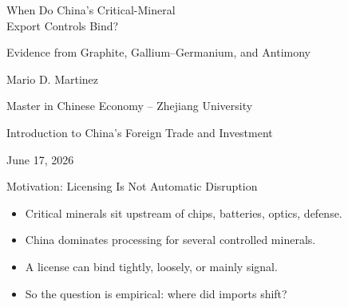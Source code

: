 \documentclass[aspectratio=169,11pt]{beamer}
\begin{document}
\begin{frame}[plain]
  \vspace{0.65cm}
  {
  When Do China's Critical-Mineral\\Export Controls Bind?\par}
  \vspace{0.4cm}
  {Evidence from Graphite, Gallium--Germanium, and Antimony\par}
  \vfill
  {\large Mario D. Martinez\par}
  \vspace{0.15cm}
  {Master in Chinese Economy -- Zhejiang University\par}
  {Introduction to China's Foreign Trade and Investment\par}
  \vspace{0.3cm}
  {June 17, 2026\par}
\end{frame}

\begin{frame}{Motivation: Licensing Is Not Automatic Disruption}
  \large
  \begin{itemize}
    \item Critical minerals sit upstream of chips, batteries, optics, defense.
    \item China dominates processing for several controlled minerals.
    \item A license can bind tightly, loosely, or mainly signal.
    \item So the question is empirical: where did imports shift?
  \end{itemize}

  \vspace{0.35cm}
  \begin{center}
  \end{center}
\end{frame}
\end{document}
